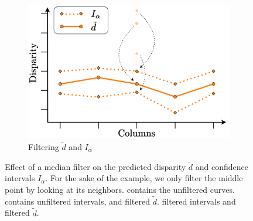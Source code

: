 \begin{figure}
\begin{subfigure}[t]{0.32\linewidth}
        \includegraphics[width=\linewidth]{Images/Chap_5/Median_filtering_3.png}
        \caption{Filtering $\tilde{d}$ and $I_\alpha$}
        \label{fig:median_filtering_3}
    \end{subfigure}
    \caption{Effect of a median filter on the predicted disparity $\tilde{d}$ and confidence intervals $I_\alpha$. For the sake of the example, we only filter the middle point by looking at its neighbors.  contains the unfiltered curves.  contains unfiltered intervals, and filtered $\tilde{d}$.  filtered intervals and filtered $\tilde{d}$.}
    \label{fig:median_filtering}
\end{figure}

